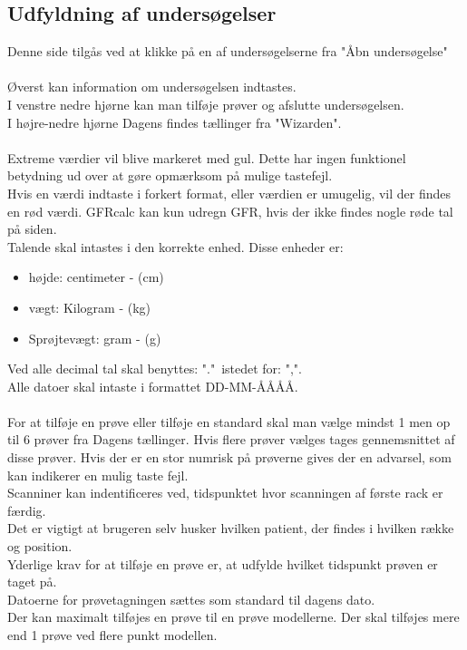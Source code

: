 \documentclass{article}
\begin{document}
\subsection{Udfyldning af undersøgelser}\label{fill_study}
Denne side tilgås ved at klikke på en af undersøgelserne fra "Åbn undersøgelse"\\\\
Øverst kan information om undersøgelsen indtastes.\\
I venstre nedre hjørne kan man tilføje prøver og afslutte undersøgelsen.\\ 
I højre-nedre hjørne Dagens findes tællinger fra "Wizarden".\\\\
Extreme værdier vil blive markeret med gul. Dette har ingen funktionel betydning ud over at gøre opmærksom på mulige tastefejl.\\ Hvis en værdi indtaste i forkert format, eller værdien er umugelig, vil der findes en rød værdi. GFRcalc kan kun udregn GFR, hvis der ikke findes nogle røde tal på siden.\\
Talende skal intastes i den korrekte enhed. Disse enheder er:
\begin{itemize}
	\item højde: centimeter - (cm)
	\item vægt: Kilogram - (kg)
	\item Sprøjtevægt: gram - (g)
\end{itemize}
Ved alle decimal tal skal benyttes: "."$\,$ istedet for: ",".\\
Alle datoer skal intaste i formattet DD-MM-ÅÅÅÅ.\\\\
For at tilføje en prøve eller tilføje en standard skal man vælge mindst 1 men op til 6 prøver fra Dagens tællinger. Hvis flere prøver vælges tages gennemsnittet af disse prøver. Hvis der er en stor numrisk på prøverne gives der en advarsel, som kan indikerer en mulig taste fejl.\\
Scanniner kan indentificeres ved, tidspunktet hvor scanningen af første rack er færdig.\\
Det er vigtigt at brugeren selv husker hvilken patient, der findes i hvilken række og position.\\
Yderlige krav for at tilføje en prøve er, at udfylde hvilket tidspunkt prøven er taget på.\\ Datoerne for prøvetagningen sættes som standard til dagens dato.\\
Der kan maximalt tilføjes en prøve til en prøve modellerne. Der skal tilføjes mere end 1 prøve ved flere punkt modellen.\\
\end{document}
